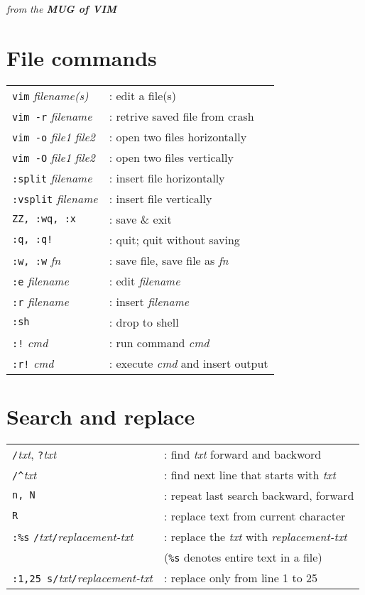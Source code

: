 \documentclass{article}
\begin{document}
\emph{from the \textbf{MUG of VIM}}\\[10pt]
\section{File commands}
\begin{tabular}{l l}
\texttt{vim} \textsl{filename(s)} &	: edit a file(s) \\
\texttt{vim -r} \textsl{filename} &	: retrive saved file from crash\\
\texttt{vim -o} \textsl{file1} \textsl{file2} & : open two files horizontally\\
\texttt{vim -O} \textsl{file1} \textsl{file2} & : open two files vertically\\
\texttt{:split} \textsl{filename} & : insert file horizontally\\
\texttt{:vsplit} \textsl{filename} & : insert file vertically\\
\texttt{ZZ, :wq, :x}			&	: save \& exit\\
\texttt{:q, :q!}				&	: quit; quit without saving\\
\texttt{:w, :w} \textsl{fn} &		: save file, save file as \textsl{fn}\\
\texttt{:e} \textsl{filename} & 	: edit \textsl{filename}\\
\texttt{:r} \textsl{filename} & 	: insert \textsl{filename}\\
\texttt{:sh} &					: drop to shell \\
\texttt{:!} \textsl{cmd} & 		: run command \textsl{cmd}\\
\texttt{:r!} \textsl{cmd} & 		: execute \textsl{cmd} and insert output\\
\end{tabular}
\section{Search and replace}
\begin{tabular}{l l}
\texttt{/}\textsl{txt}, \texttt{?}\textsl{txt} &	: find \textsl{txt} forward and backword\\
\texttt{/\^}\textsl{txt}		&				: find next line that starts with \textsl{txt}\\
\texttt{n, N} &								: repeat last search backward, forward\\
\texttt{R} &						: replace text from current character\\
\texttt{:\%s} \texttt{/}\textsl{txt}\texttt{/}\textsl{replacement-txt} & : replace the \textsl{txt} with \textsl{replacement-txt}\\
&  (\texttt{\%s} denotes entire text in a file)\\
\texttt{:1,25 s}\texttt{/}\textsl{txt}\texttt{/}\textsl{replacement-txt} &: replace only from line 1 to 25
\end{tabular}
\end{document}
